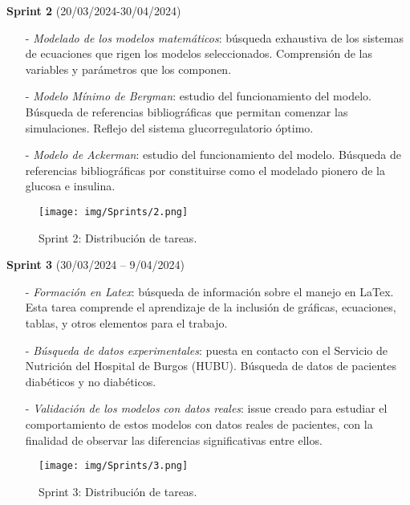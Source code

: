 \textbf{Sprint 2} (20/03/2024-30/04/2024)
\begin{enumerate}
    \item[-] \textit{Modelado de los modelos matemáticos}: búsqueda exhaustiva de los sistemas de ecuaciones que rigen los modelos seleccionados. Comprensión de las variables y parámetros que los componen.
    \item[-] \textit{Modelo Mínimo de Bergman}: estudio del funcionamiento del modelo. Búsqueda de referencias bibliográficas que permitan comenzar las simulaciones. Reflejo del sistema glucorregulatorio óptimo.
    \item[-]  \textit{Modelo de Ackerman}: estudio del funcionamiento del modelo. Búsqueda de referencias bibliográficas por constituirse como el modelado pionero de la glucosa e insulina.
\end{enumerate}

\begin{figure}[htbp]
    \centering
    \texttt{[image: img/Sprints/2.png]}
    \caption{Sprint 2: Distribución de tareas.}
    \label{fig:sprint2}
\end{figure}


\textbf{Sprint 3} (30/03/2024 – 9/04/2024)
\begin{enumerate}
    \item[-] \textit{Formación en Latex}: búsqueda de información sobre el manejo en LaTex. Esta tarea comprende el aprendizaje de la inclusión de gráficas, ecuaciones, tablas, y otros elementos para el trabajo.
    \item[-] \textit{Búsqueda de datos experimentales}: puesta en contacto con el Servicio de Nutrición del Hospital de Burgos (HUBU). Búsqueda de datos de pacientes diabéticos y no diabéticos.
    \item[-]  \textit{Validación de los modelos con datos reales}: issue creado para estudiar el comportamiento de estos modelos con datos reales de pacientes, con la finalidad de observar las diferencias significativas entre ellos.
\end{enumerate}
\clearpage

\begin{figure}[htbp]
    \centering
    \texttt{[image: img/Sprints/3.png]}
    \caption{Sprint 3: Distribución de tareas.}
    \label{fig:sprint3}
\end{figure}

